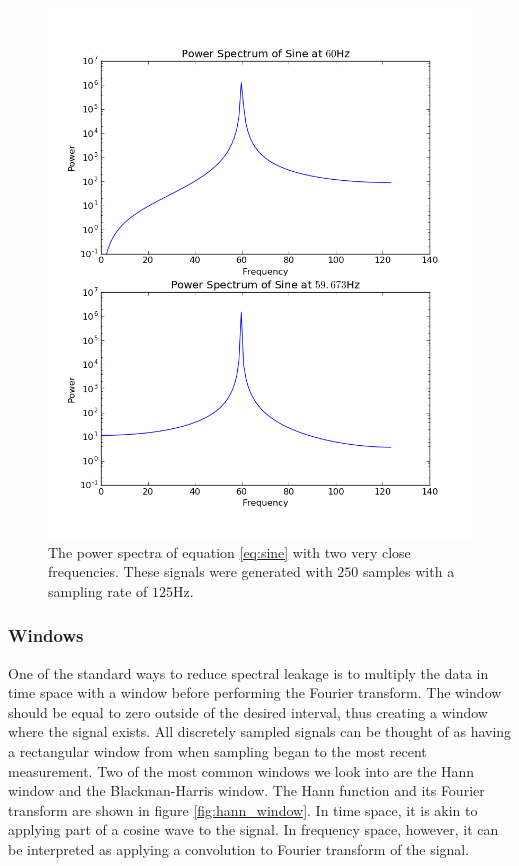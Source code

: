 \documentclass[11pt, letterpage, twocolumn]{article}
\begin{document}
\begin{figure}
  \includegraphics[width=\linewidth]{power_spectrum.png}
  \caption{
    The power spectra of equation \ref{eq:sine} with two very close
    frequencies. These signals were generated with $250$ samples with
    a sampling rate of $125$Hz.
  }
  \label{}
\end{figure}

\subsubsection{Windows}
One of the standard ways to reduce spectral leakage is to multiply the data in
time space with a window before performing the Fourier transform. The
window should be equal to zero outside of the desired interval, thus
creating a window where the signal exists. All discretely sampled
signals can be thought of as having a rectangular window from when
sampling began to the most recent measurement. Two of the
most common windows we look into are the Hann window and the Blackman-Harris
window. The Hann function and its Fourier transform are shown in figure
\ref{fig:hann_window}. In time space, it is akin to applying part of a
cosine wave to the signal. In frequency space, however, it can be
interpreted as applying a convolution to Fourier transform of the
signal. 
\end{document}
